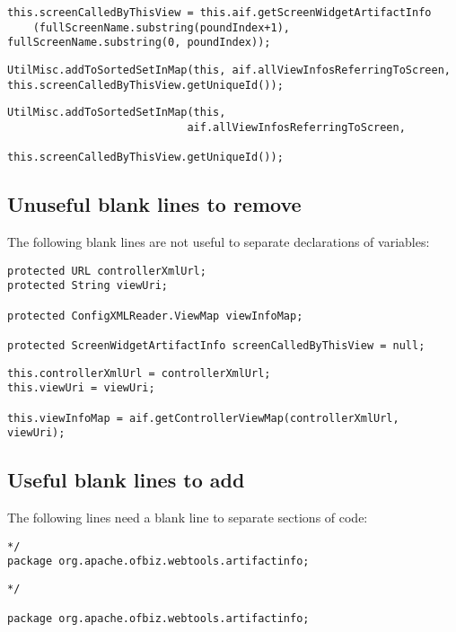\begin{lstlisting}[firstnumber=65, caption={Line 65 possible solution}]
this.screenCalledByThisView = this.aif.getScreenWidgetArtifactInfo
    (fullScreenName.substring(poundIndex+1), fullScreenName.substring(0, poundIndex));
\end{lstlisting}
\noindent\makebox[\linewidth]{\rule{\linewidth}{0.4pt}}
\begin{lstlisting}[firstnumber=68, caption={Line 68 violation of the rule}]
UtilMisc.addToSortedSetInMap(this, aif.allViewInfosReferringToScreen, this.screenCalledByThisView.getUniqueId());
\end{lstlisting}
\begin{lstlisting}[firstnumber=68, caption={Line 68 possible solution}]
UtilMisc.addToSortedSetInMap(this,
                            aif.allViewInfosReferringToScreen,
                            this.screenCalledByThisView.getUniqueId());
\end{lstlisting}

\subsection{Unuseful blank lines to remove}
The following blank lines are not useful to separate declarations of variables:
\begin{lstlisting}[firstnumber=40, caption={Lines 40-45 violation of the rule}]
protected URL controllerXmlUrl;
protected String viewUri;

protected ConfigXMLReader.ViewMap viewInfoMap;

protected ScreenWidgetArtifactInfo screenCalledByThisView = null;
\end{lstlisting}
\begin{lstlisting}[firstnumber=47, caption={Lines 47-50 violation of the rule}]
this.controllerXmlUrl = controllerXmlUrl;
this.viewUri = viewUri;

this.viewInfoMap = aif.getControllerViewMap(controllerXmlUrl, viewUri);
\end{lstlisting}

\subsection{Useful blank lines to add}
The following lines need a blank line to separate sections of code:
\begin{lstlisting}[firstnumber=18, caption={Lines 18-19 violation of the rule}]
*/
package org.apache.ofbiz.webtools.artifactinfo;
\end{lstlisting}
\begin{lstlisting}[firstnumber=18, caption={Lines 18-19 possible solution}]
*/

package org.apache.ofbiz.webtools.artifactinfo;
\end{lstlisting}

